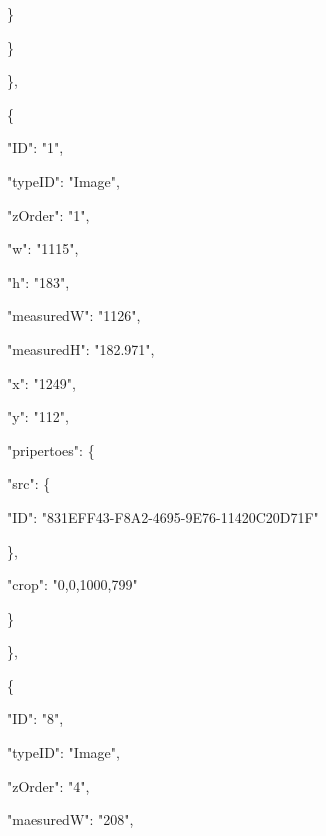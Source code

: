 \documentclass[13pt]{article}
\begin{document}
{\raggedright
{\footnotesize                         \}}
}

{\raggedright
{\footnotesize                     \}}
}

{\raggedright
{\footnotesize                 \},}
}

{\raggedright
{\footnotesize                 \{}
}

{\raggedright
{\footnotesize                     "ID": "1",}
}

{\raggedright
{\footnotesize                     "typeID": "Image",}
}

{\raggedright
{\footnotesize                     "zOrder": "1",}
}

{\raggedright
{\footnotesize                     "w": "1115",}
}

{\raggedright
{\footnotesize                     "h": "183",}
}

{\raggedright
{\footnotesize                     "measuredW": "1126",}
}

{\raggedright
{\footnotesize                     "measuredH": "182.971",}
}

{\raggedright
{\footnotesize                     "x": "1249",}
}

{\raggedright
{\footnotesize                     "y": "112",}
}

{\raggedright
{\footnotesize                     "pripertoes": \{}
}

{\raggedright
{\footnotesize                         "src": \{}
}

{\raggedright
{\footnotesize                             "ID":
"831EFF43-F8A2-4695-9E76-11420C20D71F"}
}

{\raggedright
{\footnotesize                         \},}
}

{\raggedright
{\footnotesize                         "crop": "0,0,1000,799"}
}

{\raggedright
{\footnotesize                     \}}
}

{\raggedright
{\footnotesize                 \},}
}

{\raggedright
{\footnotesize                 \{}
}

{\raggedright
{\footnotesize                     "ID": "8",}
}

{\raggedright
{\footnotesize                     "typeID": "Image",}
}

{\raggedright
{\footnotesize                     "zOrder": "4",}
}

{\raggedright
{\footnotesize                     "maesuredW": "208",}
}
\end{document}
